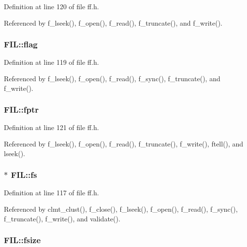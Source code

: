 Definition at line 120 of file ff.\-h.



Referenced by f\-\_\-lseek(), f\-\_\-open(), f\-\_\-read(), f\-\_\-truncate(), and f\-\_\-write().

\hypertarget{structFIL_ac409508881f5a16f2998ae675072b376}{
\subsubsection[{flag}]{ F\-I\-L\-::flag}}\label{structFIL_ac409508881f5a16f2998ae675072b376}


Definition at line 119 of file ff.\-h.



Referenced by f\-\_\-lseek(), f\-\_\-open(), f\-\_\-read(), f\-\_\-sync(), f\-\_\-truncate(), and f\-\_\-write().

\hypertarget{structFIL_a75d29cf9257c827d117887b9f924c4a9}{
\subsubsection[{fptr}]{ F\-I\-L\-::fptr}}\label{structFIL_a75d29cf9257c827d117887b9f924c4a9}


Definition at line 121 of file ff.\-h.



Referenced by f\-\_\-lseek(), f\-\_\-open(), f\-\_\-read(), f\-\_\-truncate(), f\-\_\-write(), ftell(), and lseek().

\hypertarget{structFIL_a42376a6797a06228911c8b836c1e9030}{
\subsubsection[{fs}]{$\ast$ F\-I\-L\-::fs}}\label{structFIL_a42376a6797a06228911c8b836c1e9030}


Definition at line 117 of file ff.\-h.



Referenced by clmt\-\_\-clust(), f\-\_\-close(), f\-\_\-lseek(), f\-\_\-open(), f\-\_\-read(), f\-\_\-sync(), f\-\_\-truncate(), f\-\_\-write(), and validate().

\hypertarget{structFIL_aa00790d40d7b0081c345fd4f76e22b70}{
\subsubsection[{fsize}]{ F\-I\-L\-::fsize}}\label{structFIL_aa00790d40d7b0081c345fd4f76e22b70}


